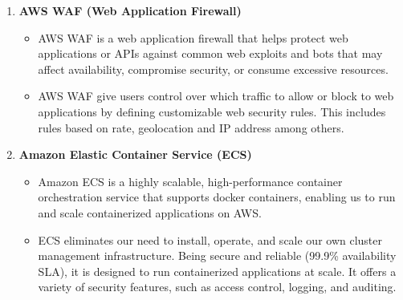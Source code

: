 \documentclass{article}
\begin{document}
\begin{enumerate}
\begin{itemize}
    \end{itemize}
    \item \textbf{AWS WAF (Web Application Firewall)}
    \begin{itemize}
        \item AWS WAF \cite{wafirewall} is a web application firewall that helps protect web applications or APIs against common web exploits and bots that may affect availability, compromise security, or consume excessive resources.
        \item AWS WAF give users control over which traffic to allow or block to web applications by defining customizable web security rules. This includes rules based on rate, geolocation and IP address among others. 
    \end{itemize}
    \item \textbf{Amazon Elastic Container Service (ECS) \label{ecs_describe}}
    \begin{itemize}
        \item Amazon ECS \cite{ecs} is a highly scalable, high-performance container orchestration service that supports docker containers, enabling us to run and scale containerized applications on AWS.
        \item ECS eliminates our need to install, operate, and scale our own cluster management infrastructure. Being secure and reliable (99.9\% availability SLA), it is designed to run containerized applications at scale. It offers a variety of security features, such as access control, logging, and auditing.



\end{itemize}
\end{enumerate}
\end{document}
